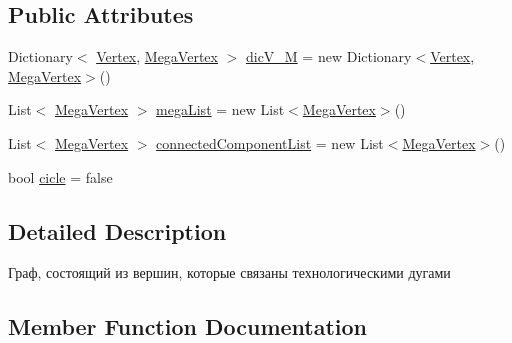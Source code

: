 \subsection*{Public Attributes}
\begin{DoxyCompactItemize}
\item 
Dictionary$<$ \mbox{\hyperlink{class_dimension___chain_1_1_vertex}{Vertex}}, \mbox{\hyperlink{class_dimension___chain_1_1_mega_vertex}{Mega\+Vertex}} $>$ \mbox{\hyperlink{class_dimension___chain_1_1_tech_graph_a80c1cd831ba29a79fd9cedd2ef96e0d6}{dic\+V\+\_\+M}} = new Dictionary$<$\mbox{\hyperlink{class_dimension___chain_1_1_vertex}{Vertex}}, \mbox{\hyperlink{class_dimension___chain_1_1_mega_vertex}{Mega\+Vertex}}$>$()
\item 
List$<$ \mbox{\hyperlink{class_dimension___chain_1_1_mega_vertex}{Mega\+Vertex}} $>$ \mbox{\hyperlink{class_dimension___chain_1_1_tech_graph_a8ae5de1b7b7cc6438d8dc879cc7baa5d}{mega\+List}} = new List$<$\mbox{\hyperlink{class_dimension___chain_1_1_mega_vertex}{Mega\+Vertex}}$>$()
\item 
List$<$ \mbox{\hyperlink{class_dimension___chain_1_1_mega_vertex}{Mega\+Vertex}} $>$ \mbox{\hyperlink{class_dimension___chain_1_1_tech_graph_a6a1f06b67ab3ec7ced24c72f67ca93fe}{connected\+Component\+List}} = new List$<$\mbox{\hyperlink{class_dimension___chain_1_1_mega_vertex}{Mega\+Vertex}}$>$()
\item 
bool \mbox{\hyperlink{class_dimension___chain_1_1_tech_graph_a56efac5fd6affbd1f2f4db5e4c7ec3f0}{cicle}} = false
\end{DoxyCompactItemize}


\subsection{Detailed Description}
Граф, состоящий из вершин, которые связаны технологическими дугами 



\subsection{Member Function Documentation}
\mbox{\label{class_dimension___chain_1_1_tech_graph_a718d1eefbf5548e20411ef4563522cd8}} 
